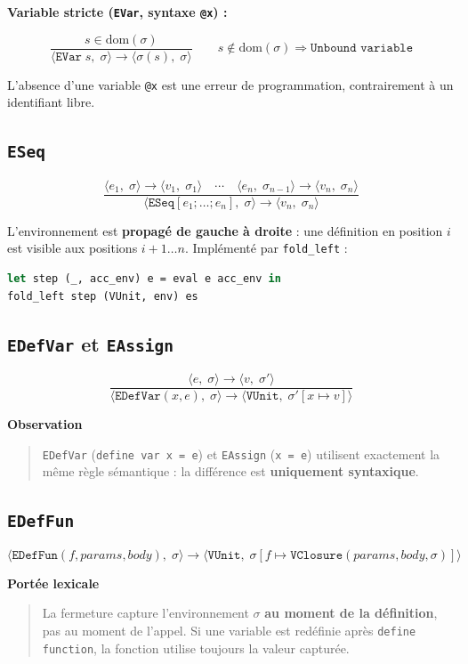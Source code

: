 \documentclass[11pt,a4paper]{article}
\newcommand{\sem}[4]{%
  \langle #1,\;#2\rangle \rightarrow \langle #3,\;#4\rangle}
\newcommand{\ext}[3]{#1\!\left[#2 \mapsto #3\right]}
\newcommand{\irule}[2]{%
  \dfrac{\displaystyle #1}{\displaystyle #2}
}
\newcommand{\dom}[1]{\mathrm{dom}(#1)}
\newcommand{\V}[1]{\mathtt{#1}}
\newenvironment{bloc}[1]
{
  \par\medskip
  \noindent\textbf{#1}
  \par
  \smallskip
  \begin{quote}
}
{
  \end{quote}
  \medskip
}
\begin{document}
\textbf{Variable stricte (\texttt{EVar}, syntaxe \texttt{@x}) :}

\[
\irule{
s \in \dom{\sigma}
}{
\sem{\V{EVar}\;s}{\sigma}{\sigma(s)}{\sigma}
}
\qquad
s \notin \dom{\sigma}
\Rightarrow
\texttt{Unbound variable}
\]

L'absence d'une variable \texttt{@x} est une erreur de programmation,
contrairement à un identifiant libre.

\subsection{\texttt{ESeq}}

\[
\irule{
\sem{e_1}{\sigma}{v_1}{\sigma_1}
\quad
\cdots
\quad
\sem{e_n}{\sigma_{n-1}}{v_n}{\sigma_n}
}{
\sem{\V{ESeq}[e_1;\dots;e_n]}{\sigma}{v_n}{\sigma_n}
}
\]

L'environnement est \textbf{propagé de gauche à droite} :
une définition en position $i$ est visible aux positions $i+1 \ldots n$.
Implémenté par \texttt{fold\_left} :

\begin{lstlisting}[language=ml]
let step (_, acc_env) e = eval e acc_env in
fold_left step (VUnit, env) es
\end{lstlisting}

\subsection{\texttt{EDefVar} et \texttt{EAssign}}

\[
\irule{
\sem{e}{\sigma}{v}{\sigma'}
}{
\sem{\V{EDefVar}(x,e)}
{\sigma}
{\V{VUnit}}
{\ext{\sigma'}{x}{v}}
}
\]

\begin{bloc}{Observation}
\texttt{EDefVar} (\texttt{define var x = e}) et \texttt{EAssign} (\texttt{x = e})
utilisent exactement la même règle sémantique :
la différence est \textbf{uniquement syntaxique}.
\end{bloc}

\subsection{\texttt{EDefFun}}

\[
\sem{
\V{EDefFun}(f,params,body)
}{
\sigma
}{
\V{VUnit}
}{
\ext{\sigma}{f}{
\V{VClosure}(params,body,\sigma)
}
}
\]

\begin{bloc}{Portée lexicale}
La fermeture capture l'environnement $\sigma$
\textbf{au moment de la définition}, pas au moment de l'appel.
Si une variable est redéfinie après \texttt{define function},
la fonction utilise toujours la valeur capturée.
\end{bloc}
\end{document}

